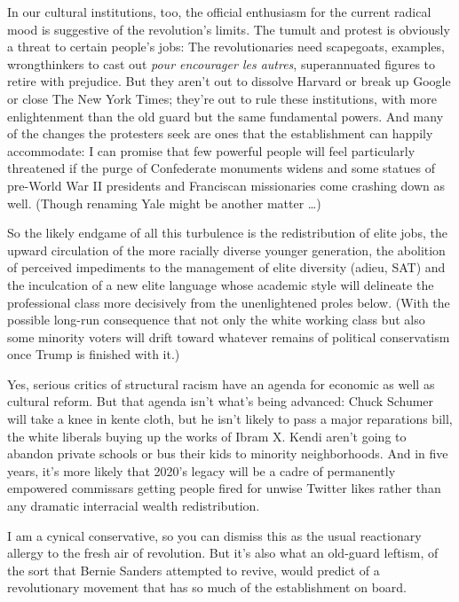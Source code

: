 In our cultural institutions, too, the official enthusiasm for the
current radical mood is suggestive of the revolution's limits. The
tumult and protest is obviously a threat to certain people's jobs: The
revolutionaries need scapegoats, examples, wrongthinkers to cast out
\emph{pour encourager les autres}, superannuated figures to retire with
prejudice. But they aren't out to dissolve Harvard or break up Google or
close The New York Times; they're out to rule these institutions, with
more enlightenment than the old guard but the same fundamental powers.
And many of the changes the protesters seek are ones that the
establishment can happily accommodate: I can promise that few powerful
people will feel particularly threatened if the purge of Confederate
monuments widens and some statues of pre-World War II presidents and
Franciscan missionaries come crashing down as well. (Though renaming
Yale might be another matter \ldots{})

So the likely endgame of all this turbulence is the redistribution of
elite jobs, the upward circulation of the more racially diverse younger
generation, the abolition of perceived impediments to the management of
elite diversity (adieu, SAT) and the inculcation of a new elite language
whose academic style will delineate the professional class more
decisively from the unenlightened proles below. (With the possible
long-run consequence that not only the white working class but also some
minority voters will drift toward whatever remains of political
conservatism once Trump is finished with it.)

Yes, serious critics of structural racism have an agenda for economic as
well as cultural reform. But that agenda isn't what's being advanced:
Chuck Schumer will take a knee in kente cloth, but he isn't likely to
pass a major reparations bill, the white liberals buying up the works of
Ibram X. Kendi aren't going to abandon private schools or bus their kids
to minority neighborhoods. And in five years, it's more likely that
2020's legacy will be a cadre of permanently empowered commissars
getting people fired for unwise Twitter likes rather than any dramatic
interracial wealth redistribution.

I am a cynical conservative, so you can dismiss this as the usual
reactionary allergy to the fresh air of revolution. But it's also what
an old-guard leftism, of the sort that Bernie Sanders attempted to
revive, would predict of a revolutionary movement that has so much of
the establishment on board.

